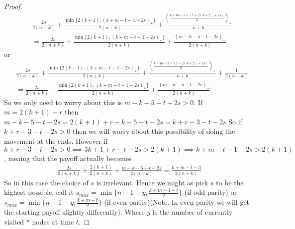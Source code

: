\documentclass[a4paper,10pt]{article}
\newcommand{\pospart}[1]{\left( #1 \right)_{+}}
\theoremstyle{definition}
\theoremstyle{definition}
\theoremstyle{remark}
\theoremstyle{definition}
\begin{document}
\begin{proof}
\begin{align*}
&\frac{2s}{2(n+k)}+\frac{\min \{ 2(k+1), \pospart{k+m-t-1-2s} \}}{2(n+k)} +\frac{\pospart{\frac{k+m-1-(t+2(k+2)+2s)}{2}}}{n+k} \\
&=\frac{2s}{2(n+k)}+\frac{\min \{ 2(k+1), \pospart{k+m-t-1-2s} \}}{2(n+k)} +\frac{\pospart{m-k-5-t-2s}}{2(n+k)} 
\end{align*}
or
\begin{align*}
&\frac{2s}{2(n+k)}+\frac{\min \{ 2(k+1), \pospart{k+m-t-1-2s} \}}{2(n+k)} +\frac{\pospart{\frac{k+m-2-(t+2(k+2)+2s)}{2}}}{n+k}+\frac{1}{2(n+k)} \\
&=\frac{2s}{2(n+k)}+\frac{\min \{ 2(k+1), \pospart{k+m-t-1-2s} \}}{2(n+k)} +\frac{\pospart{m-k-5-t-2s}}{2(n+k)} 
\end{align*}
So we only need to worry about this is $m-k-5-t-2s >0$.
If $m=2(k+1)+r$ then $m-k-5-t-2s=2(k+1)+r-k-5-t-2s=k+r-3-t-2s$
So if $k+r-3-t-2s> 0$ then we will worry about this possibility of doing the movement at the ends.
However if $k+r-3-t-2s >0 \implies 3k+1+r-t-2s>2(k+1) \implies k+m-t-1-2s>2(k+1)$ , meaing that the payoff actually becomes
\begin{align*}
\frac{2s}{2(n+k)}+\frac{2(k+1)}{2(n+k)} +\frac{m-k-5-t-2s}{2(n+k)}
=\frac{k+m-t-3}{2(n+k)}
\end{align*}
So in this case the choice of $s$ is irrelevant,
Hence we might as pick $s$ to be the highest possible, call it $s_{max}=\min \{ n-1-y,\frac{k+m-1-t}{2} \}$ (if odd parity) or $s_{max}=\min \{ n-1-y, \frac{k+m-t}{2} \}$ (if even parity)(Note. In even parity we will get the starting payoff slightly differently).
Where $y$ is the number of currently visited $*$ nodes at time $t$.


\end{proof}
\end{document}
